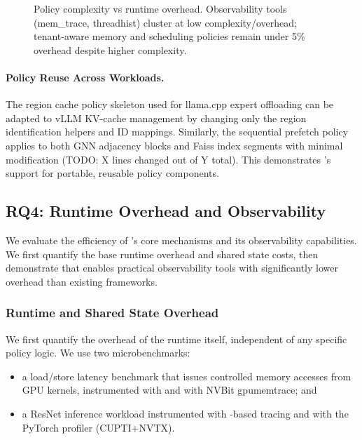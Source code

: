 \begin{figure}
\centering
{}
\caption{Policy complexity vs runtime overhead. Observability tools (mem\_trace, threadhist) cluster at low complexity/overhead; tenant-aware memory and scheduling policies remain under 5\% overhead despite higher complexity.}
\label{fig:complexity-overhead}
\end{figure}

\paragraph{Policy Reuse Across Workloads.}
The region cache policy skeleton used for llama.cpp expert offloading can be adapted to vLLM KV-cache management by changing only the region identification helpers and ID mappings. Similarly, the sequential prefetch policy applies to both GNN adjacency blocks and Faiss index segments with minimal modification (TODO: X lines changed out of Y total). This demonstrates \sys's support for portable, reusable policy components.

\subsection{RQ4: Runtime Overhead and Observability}

We evaluate the efficiency of \sys's core mechanisms and its observability capabilities. We first quantify the base runtime overhead and shared state costs, then demonstrate that \sys enables practical observability tools with significantly lower overhead than existing frameworks.

\subsubsection{Runtime and Shared State Overhead}

We first quantify the overhead of the \sys runtime itself, independent of any
specific policy logic. We use two microbenchmarks:

\begin{itemize}[leftmargin=*]
  \item a load/store latency benchmark that issues controlled memory accesses
        from GPU kernels, instrumented with \sys and with NVBit gpumemtrace; and
  \item a ResNet inference workload instrumented with \sys-based tracing and
        with the PyTorch profiler (CUPTI+NVTX).
\end{itemize}


